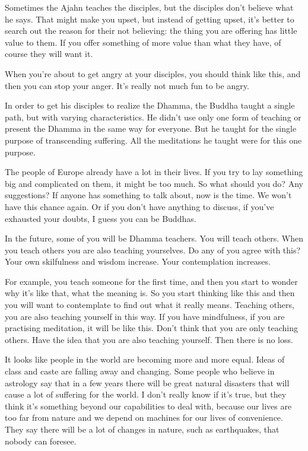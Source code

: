 Sometimes the Ajahn teaches the disciples, but the disciples don't believe what he says. That might make you upset, but instead of getting upset, it's better to search out the reason for their not believing: the thing you are offering has little value to them. If you offer something of more value than what they have, of course they will want it.

When you're about to get angry at your disciples, you should think like this, and then you can stop your anger. It's really not much fun to be angry.

In order to get his disciples to realize the Dhamma, the Buddha taught a single path, but with varying characteristics. He didn't use only one form of teaching or present the Dhamma in the same way for everyone. But he taught for the single purpose of transcending suffering. All the meditations he taught were for this one purpose.

The people of Europe already have a lot in their lives. If you try to lay something big and complicated on them, it might be too much. So what should you do? Any suggestions? If anyone has something to talk about, now is the time. We won't have this chance again. Or if you don't have anything to discuss, if you've exhausted your doubts, I guess you can be  Buddhas.

In the future, some of you will be Dhamma teachers. You will teach others. When you teach others you are also teaching yourselves. Do any of you agree with this? Your own skilfulness and wisdom increase. Your contemplation increases.

For example, you teach someone for the first time, and then you start to wonder why it's like that, what the meaning is. So you start thinking like this and then you will want to contemplate to find out what it really means. Teaching others, you are also teaching yourself in this way. If you have mindfulness, if you are practising meditation, it will be like this. Don't think that you are only teaching others. Have the idea that you are also teaching yourself. Then there is no loss.

 It looks like people in the world are becoming more and more equal. Ideas of class and caste are falling away and changing. Some people who believe in astrology say that in a few years there will be great natural disasters that will cause a lot of suffering for the world. I don't really know if it's true, but they think it's something beyond our capabilities to deal with, because our lives are too far from nature and we depend on machines for our lives of convenience. They say there will be a lot of changes in nature, such as earthquakes, that nobody can foresee.

